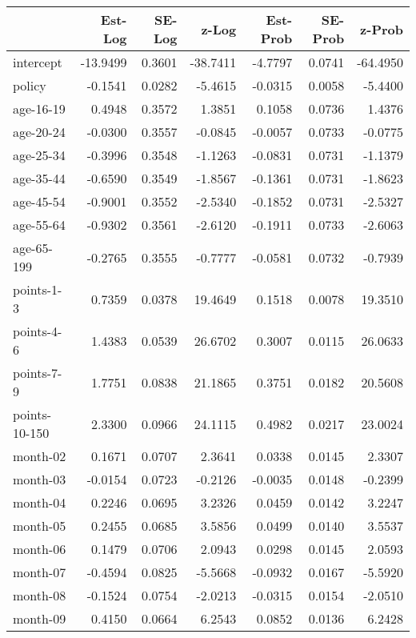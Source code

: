 \documentclass[10pt]{article}
\begin{document}
\begin{table}[ht]
\centering
\begin{tabular}{lrrrrrr}
  \hline
 & Est-Log & SE-Log & z-Log & Est-Prob & SE-Prob & z-Prob \\ 
  \hline
intercept & -13.9499 & 0.3601 & -38.7411 & -4.7797 & 0.0741 & -64.4950 \\ 
  policy & -0.1541 & 0.0282 & -5.4615 & -0.0315 & 0.0058 & -5.4400 \\ 
  age-16-19 & 0.4948 & 0.3572 & 1.3851 & 0.1058 & 0.0736 & 1.4376 \\ 
  age-20-24 & -0.0300 & 0.3557 & -0.0845 & -0.0057 & 0.0733 & -0.0775 \\ 
  age-25-34 & -0.3996 & 0.3548 & -1.1263 & -0.0831 & 0.0731 & -1.1379 \\ 
  age-35-44 & -0.6590 & 0.3549 & -1.8567 & -0.1361 & 0.0731 & -1.8623 \\ 
  age-45-54 & -0.9001 & 0.3552 & -2.5340 & -0.1852 & 0.0731 & -2.5327 \\ 
  age-55-64 & -0.9302 & 0.3561 & -2.6120 & -0.1911 & 0.0733 & -2.6063 \\ 
  age-65-199 & -0.2765 & 0.3555 & -0.7777 & -0.0581 & 0.0732 & -0.7939 \\ 
  points-1-3 & 0.7359 & 0.0378 & 19.4649 & 0.1518 & 0.0078 & 19.3510 \\ 
  points-4-6 & 1.4383 & 0.0539 & 26.6702 & 0.3007 & 0.0115 & 26.0633 \\ 
  points-7-9 & 1.7751 & 0.0838 & 21.1865 & 0.3751 & 0.0182 & 20.5608 \\ 
  points-10-150 & 2.3300 & 0.0966 & 24.1115 & 0.4982 & 0.0217 & 23.0024 \\ 
  month-02 & 0.1671 & 0.0707 & 2.3641 & 0.0338 & 0.0145 & 2.3307 \\ 
  month-03 & -0.0154 & 0.0723 & -0.2126 & -0.0035 & 0.0148 & -0.2399 \\ 
  month-04 & 0.2246 & 0.0695 & 3.2326 & 0.0459 & 0.0142 & 3.2247 \\ 
  month-05 & 0.2455 & 0.0685 & 3.5856 & 0.0499 & 0.0140 & 3.5537 \\ 
  month-06 & 0.1479 & 0.0706 & 2.0943 & 0.0298 & 0.0145 & 2.0593 \\ 
  month-07 & -0.4594 & 0.0825 & -5.5668 & -0.0932 & 0.0167 & -5.5920 \\ 
  month-08 & -0.1524 & 0.0754 & -2.0213 & -0.0315 & 0.0154 & -2.0510 \\ 
  month-09 & 0.4150 & 0.0664 & 6.2543 & 0.0852 & 0.0136 & 6.2428 \\ 

\end{tabular}
\end{table}
\end{document}
